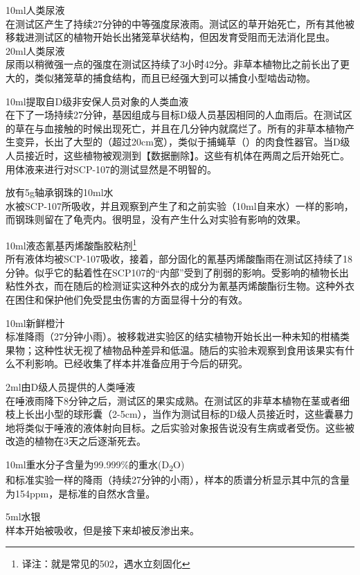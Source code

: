 10ml人类尿液\\
在测试区产生了持续27分钟的中等强度尿液雨。测试区的草开始死亡，所有其他被移栽进测试区的植物开始长出猪笼草状结构，但因发育受阻而无法消化昆虫。\\
20ml人类尿液\\
尿雨以稍微强一点的强度在测试区持续了3小时42分。非草本植物比之前长出了更大的，类似猪笼草的捕食结构，而且已经强大到可以捕食小型啮齿动物。

10ml提取自D级非安保人员对象的人类血液\\
在下了一场持续27分钟，基因组成与目标D级人员基因相同的人血雨后。在测试区的草在与血接触的时候出现死亡，并且在几分钟内就腐烂了。所有的非草本植物产生变异，长出了大型的（超过20cm宽），类似于捕蝇草（）的肉食性器官。当D级人员接近时，这些植物被观测到【数据删除】。这些有机体在两周之后开始死亡。用体液来进行对SCP-107的测试显然是不明智的。

放有5g轴承钢珠的10ml水\\
水被SCP-107所吸收，并且观察到产生了和之前实验（10ml自来水）一样的影响，而钢珠则留在了龟壳内。很明显，没有产生什么对实验有影响的效果。

10ml液态氰基丙烯酸酯胶粘剂\footnote{译注：就是常见的502，遇水立刻固化}\\
所有液体均被SCP-107吸收，接着，部分固化的氰基丙烯酸酯雨在测试区持续了18分钟。似乎它的黏着性在SCP107的“内部”受到了削弱的影响。受影响的植物长出粘性外衣，而在随后的检测证实这种外衣的成分为氰基丙烯酸酯衍生物。这种外衣在困住和保护他们免受昆虫伤害的方面显得十分的有效。

10ml新鲜橙汁\\
标准降雨（27分钟小雨）。被移栽进实验区的结实植物开始长出一种未知的柑橘类果物；这种性状无视了植物品种差异和低温。随后的实验未观察到食用该果实有什么不利影响。已经收集了样本并准备应用于今后的研究。

2ml由D级人员提供的人类唾液\\
在唾液雨降下8分钟之后，测试区的果实成熟。在测试区的非草本植物在茎或者细枝上长出小型的球形囊（2-5cm），当作为测试目标的D级人员接近时，这些囊暴力地将类似于唾液的液体射向目标。之后实验对象报告说没有生病或者受伤。这些被改造的植物在3天之后逐渐死去。

10ml重水分子含量为99.999\%的重水(D\textsubscript{2}O)\\
和标准实验一样的降雨（持续27分钟的小雨），样本的质谱分析显示其中氘的含量为154ppm，是标准的自然水含量。

5ml水银\\
样本开始被吸收，但是接下来却被反渗出来。
